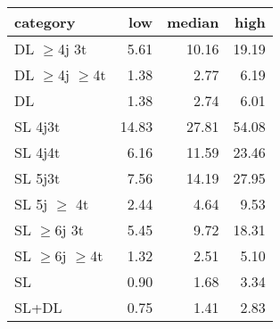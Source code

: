 \begin{tabular}{lrrr}
\hline
 category             &   low &   median &   high \\
\hline
 DL $\geq$4j 3t       &  5.61 &    10.16 &  19.19 \\
 DL $\geq$4j $\geq$4t &  1.38 &     2.77 &   6.19 \\
 DL                   &  1.38 &     2.74 &   6.01 \\
 SL 4j3t              & 14.83 &    27.81 &  54.08 \\
 SL 4j4t              &  6.16 &    11.59 &  23.46 \\
 SL 5j3t              &  7.56 &    14.19 &  27.95 \\
 SL 5j $\geq$ 4t      &  2.44 &     4.64 &   9.53 \\
 SL $\geq$6j $3$t     &  5.45 &     9.72 &  18.31 \\
 SL $\geq$6j $\geq$4t &  1.32 &     2.51 &   5.10 \\
 SL                   &  0.90 &     1.68 &   3.34 \\
 SL+DL                &  0.75 &     1.41 &   2.83 \\
\hline
\end{tabular}